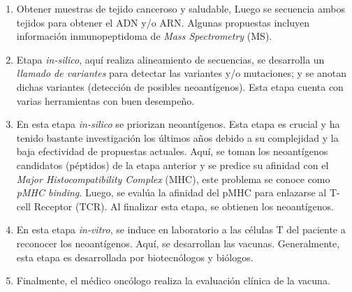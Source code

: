 \documentclass[a4paper,11pt]{article}
\begin{document}
	
	\begin{enumerate}
		\item Obtener muestras de tejido canceroso y saludable, Luego se secuencia ambos tejidos para obtener el ADN y/o ARN. Algunas propuestas incluyen información inmunopeptidoma de \textit{Mass Spectrometry} (MS).
		\item Etapa \textit{in-silico}, aquí realiza alineamiento de secuencias, se desarrolla un \textit{llamado de variantes} para detectar las variantes y/o mutaciones; y se anotan dichas variantes (detección de posibles neoantígenos). Esta etapa cuenta con varias herramientas con buen desempeño.
		\item En esta etapa \textit{in-silico} se priorizan neoantígenos. Esta etapa es crucial y ha tenido bastante investigación los últimos años debido a su complejidad y la baja efectividad de propuestas actuales. Aquí, se toman los neoantígenos candidatos (péptidos) de la etapa anterior y se predice su afinidad con el \textit{Major Histocompatibility Complex} (MHC), este problema se conoce como \textit{pMHC binding}. Luego, se  evalúa la afinidad del pMHC para enlazarse al T-cell Receptor (TCR). Al finalizar esta etapa, se obtienen los neoantígenos.
		\item En esta etapa \textit{in-vitro}, se induce en laboratorio  a las células T del paciente a reconocer los neoantígenos. Aquí, se desarrollan las vacunas. Generalmente, esta etapa es desarrollada por biotecnólogos y biólogos.
		\item Finalmente, el médico oncólogo realiza la evaluación clínica de la vacuna.
	\end{enumerate}
	
	
	
	
	
	
	
\end{document}
